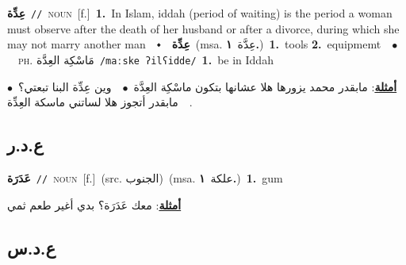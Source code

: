 \documentclass[10pt,a4paper,twoside]{article} %
\begin{document}
\begin{multicols}{2}
{\setlength\topsep{0pt}\textbf{\foreignlanguage{arabic}{عِدِّة}}\ {\color{gray}\texttt{//}\color{black}}\ \textsc{noun}\ [f.]\ \textbf{1.}~In Islam, iddah (period of waiting) is the period a woman must observe after the death of her husband or after a divorce, during which she may not marry another man\ \ $\smblkdiamond$\ \ \setlength\topsep{0pt}\textbf{\foreignlanguage{arabic}{عِدِّة}}\ \color{gray}(msa. \foreignlanguage{arabic}{عِدَّة}~\foreignlanguage{arabic}{\textbf{١.}})\color{black}\ \textbf{1.}~tools  \textbf{2.}~equipmemt\ \ $\bullet$\ \ \textsc{ph.} \color{gray} \foreignlanguage{arabic}{مَاسْكِة العِدَّة}\color{black}\ {\color{gray}\texttt{/{\sffamily maːske ʔilʕidde}/}\color{black}}\ \textbf{1.}~be in Iddah\  \begin{flushright}\color{gray}\foreignlanguage{arabic}{\textbf{\underline{\foreignlanguage{arabic}{أمثلة}}}: مابقدر محمد يزورها هلا عشانها بتكون ماسْكِة العِدَّة\ $\bullet$\ \  وين عِدِّة البنا تبعتي؟\ $\bullet$\ \  مابقدر أتجوز هلا لساتني ماسكة العِدِّة.}\end{flushright}\color{black}} \vspace{2mm}

\vspace{-3mm}
\subsection*{\color{blue}\foreignlanguage{arabic}{ع.د.ر}\color{blue}{}} 

{\setlength\topsep{0pt}\textbf{\foreignlanguage{arabic}{عَدَرَة}}\ {\color{gray}\texttt{//}\color{black}}\ \textsc{noun}\ [f.]\ (src. \color{gray}\foreignlanguage{arabic}{الجنوب}\color{black})\ \color{gray}(msa. \foreignlanguage{arabic}{علكة}~\foreignlanguage{arabic}{\textbf{١.}})\color{black}\ \textbf{1.}~gum\  \begin{flushright}\color{gray}\foreignlanguage{arabic}{\textbf{\underline{\foreignlanguage{arabic}{أمثلة}}}: معك عَدَرَة؟ بدي أغير طعم ثمي}\end{flushright}\color{black}} \vspace{2mm}

\vspace{-3mm}
\subsection*{\color{blue}\foreignlanguage{arabic}{ع.د.س}\color{blue}{}} 


\end{multicols}
\end{document}
